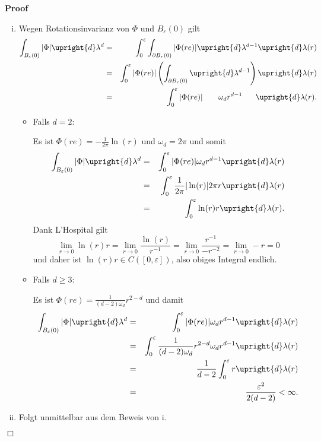 \documentclass{book}
\newenvironment{enumerateroman}{\begin{enumerate}[i.] }{\end{enumerate}}
\newenvironment{itemizedot}{\begin{itemize} \renewcommand{\labelitemi}{$\bullet$}\renewcommand{\labelitemii}{$\bullet$}\renewcommand{\labelitemiii}{$\bullet$}\renewcommand{\labelitemiv}{$\bullet$}}{\end{itemize}}
\newenvironment{proof}{\noindent\textbf{Proof\ }}{\hspace*{\fill}$\Box$\medskip}
\begin{document}
\begin{proof}
  
  \begin{enumerateroman}
    \item Wegen Rotationsinvarianz von $\Phi$ und $B_{\varepsilon} (0)$ gilt
    \begin{eqnarray*}
      \int_{B_{\varepsilon} (0)} | \Phi | \upright{d} \lambda^d & = &
      \int_0^{\varepsilon} \int_{\partial B_r (0)} | \Phi (r e ) | 
      \upright{d} \lambda^{d - 1} \upright{d} \lambda  (r)\\
      & = & \int_0^{\varepsilon} | \Phi (r e) | \left( \int_{\partial B_r
      (0)}  \upright{d} \lambda^{d - 1} \right) \upright{d} \lambda  (r)\\
      & = & \int_0^{\varepsilon} | \Phi (r e) | \qquad \omega_d r^{d - 1}
      \hspace{1.7em}  \upright{d} \lambda  (r) .
    \end{eqnarray*}
    \begin{itemizedot}
      \item Falls $d = 2$:
      
      Es ist $\Phi (r e) = - \frac{1}{2 \pi} \ln (r)$ und $\omega_d = 2 \pi$
      und somit
      \begin{eqnarray*}
        \int_{B_{\varepsilon} (0)} | \Phi | \upright{d} \lambda^d & = &
        \int_0^{\varepsilon} | \Phi (r e) | \omega_d r^{d - 1} \upright{d}
        \lambda  (r)\\
        & = & \int_0^{\varepsilon} \frac{1}{2 \pi} | \ln (r) | 2 \pi r
        \upright{d} \lambda  (r)\\
        & = & \int_0^{\varepsilon} \ln (r) r \upright{d} \lambda  (r) .
      \end{eqnarray*}
      {\hspace{1.7em}}Dank L'Hospital gilt
      \[ \lim_{r \rightarrow 0} \ln (r) r = \lim_{r \rightarrow 0} \frac{\ln
         (r)}{r^{- 1}} = \lim_{r \rightarrow 0} \frac{r^{- 1}}{- r^{- 2}} =
         \lim_{r \rightarrow 0} - r = 0 \]
      und daher ist $\ln (r) r \in C ([0, \varepsilon])$, also obiges Integral
      endlich.
      
      \item Falls $d \geq 3$:
      
      Es ist $\Phi (r e) = \frac{1}{(d - 2) \omega_d} r^{2 - d}$ und damit
      \begin{eqnarray*}
        \int_{B_{\varepsilon} (0)} | \Phi | \upright{d} \lambda^d & = &
        \int_0^{\varepsilon} | \Phi (r e) | \omega_d r^{d - 1} \upright{d}
        \lambda  (r)\\
        & = & \int_0^{\varepsilon} \frac{1}{(d - 2) \omega_d} r^{2 - d}
        \omega_d r^{d - 1} \upright{d} \lambda  (r)\\
        & = & \frac{1}{d - 2} \int_0^{\varepsilon} r \upright{d} \lambda 
        (r)\\
        & = & \frac{\varepsilon^2}{2 (d - 2)} < \infty .
      \end{eqnarray*}
    \end{itemizedot}
    \item Folgt unmittelbar aus dem Beweis von i.
    

\end{enumerateroman}
\end{proof}
\end{document}
